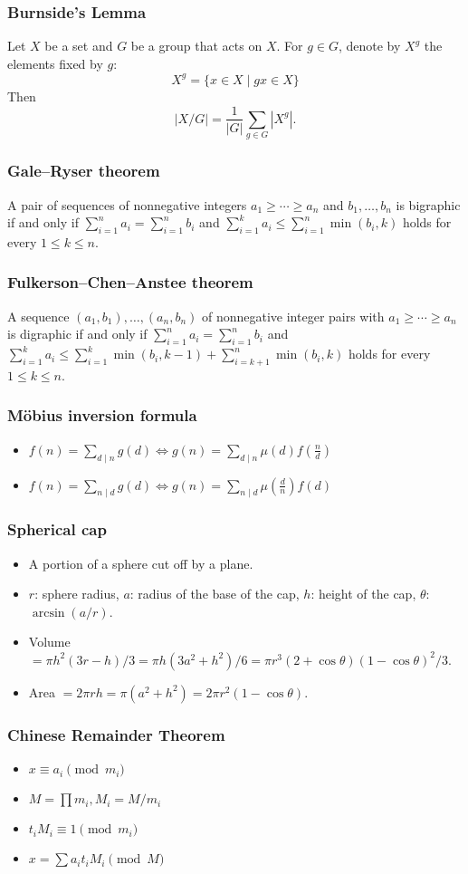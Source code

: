 \subsubsection{Burnside's Lemma}
Let $X$ be a set and $G$ be a group that acts on $X$.
For $g \in G$, denote by $X^g$ the elements fixed by $g$:
\[
X^g = \{ x \in X \mid gx \in X \}
\]
Then
\[
|X/G| = \frac{1}{|G|} \sum_{g \in G} |X^g|.
\]

\subsubsection{Gale–Ryser theorem}
A pair of sequences of nonnegative integers $a_1\ge\cdots\ge a_n$ and $b_1,\ldots,b_n$ is bigraphic if and only if $\displaystyle\sum_{i=1}^n a_i=\displaystyle\sum_{i=1}^n b_i$ and $\displaystyle\sum_{i=1}^k a_i\le \displaystyle\sum_{i=1}^n\min(b_i,k)$ holds for every $1\le k\le n$.

\subsubsection{Fulkerson–Chen–Anstee theorem}
A sequence $(a_1,b_1),\ldots,(a_n,b_n)$ of nonnegative integer pairs with $a_1\ge\cdots\ge a_n$ is digraphic if and only if $\displaystyle\sum_{i=1}^n a_i=\displaystyle\sum_{i=1}^n b_i$ and $\displaystyle\sum_{i=1}^k a_i\le \displaystyle\sum_{i=1}^k\min(b_i,k-1)+\displaystyle\sum_{i=k+1}^n\min(b_i,k)$ holds for every $1\le k\le n$.

\subsubsection{Möbius inversion formula}
\begin{itemize}
    \itemsep-0.5em
  \item $f(n)=\sum_{d\mid n}g(d)\Leftrightarrow g(n)=\sum_{d\mid n}\mu(d)f(\frac{n}{d})$
  \item $f(n)=\sum_{n\mid d}g(d)\Leftrightarrow g(n)=\sum_{n\mid d}\mu(\frac{d}{n})f(d)$
\end{itemize}

\subsubsection{Spherical cap}
\begin{itemize}
    \itemsep-0.5em
  \item A portion of a sphere cut off by a plane.
  \item $r$: sphere radius, $a$: radius of the base of the cap, $h$: height of the cap, $\theta$: $\arcsin(a/r)$.
  \item Volume $=\pi h^2(3r-h)/3=\pi h(3a^2+h^2)/6=\pi r^3(2+\cos\theta)(1-\cos\theta)^2/3$.
  \item Area $=2\pi rh=\pi(a^2+h^2)=2\pi r^2(1-\cos\theta)$.
\end{itemize}

\subsubsection{Chinese Remainder Theorem}
\begin{itemize}
    \itemsep-0.5em
  \item $x \equiv a_i \pmod {m_i}$
  \item $M = \prod m_i, M_i = M / m_i$
  \item $t_iM_i \equiv 1 \pmod {m_i}$
  \item $x = \sum a_it_iM_i \pmod M$
\end{itemize}